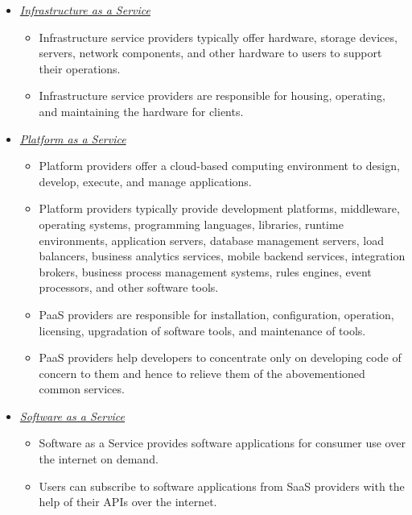 \documentclass[a4paper, 12pt]{article}
\begin{document}
\begin{itemize}
\begin{itemize}
\item
\textit{\underline{Infrastructure as a Service}}
\begin{itemize}
\item
Infrastructure service providers typically offer hardware, storage devices, servers, network components, and other hardware to users to support their operations.
\item
Infrastructure service providers are responsible for housing, operating, and maintaining the hardware for clients.
\end{itemize}

\item
\textit{\underline{Platform as a Service}}
\begin{itemize}
\item
Platform providers offer a cloud-based computing environment to design, develop, execute, and manage applications.
\item
Platform providers typically provide development platforms, middleware, operating systems, programming languages, libraries, runtime environments, application servers, database management servers, load balancers, business analytics services, mobile backend services, integration brokers, business process management systems, rules engines, event processors, and other software tools.
\item
PaaS providers are responsible for installation, configuration, operation, licensing, upgradation of software tools, and maintenance of tools.
\item
PaaS providers help developers to concentrate only on developing code of concern to them and hence to relieve them of the abovementioned common services.
\end{itemize}

\item
\textit{\underline{Software as a Service}}
\begin{itemize}
\item
Software as a Service provides software applications for consumer use over the internet on demand.
\item
Users can subscribe to software applications from SaaS providers with the help of their APIs over the internet.
\end{itemize}

\end{itemize}


\end{itemize}
\end{document}
